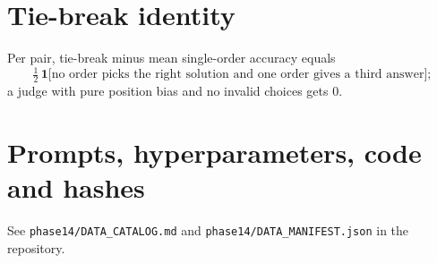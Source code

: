 \documentclass[11pt]{article}
\begin{document}
\section{Tie-break identity}\label{app:identity}Per pair, tie-break minus mean
single-order accuracy equals
\[\tfrac12\,\mathbf{1}\bigl[\text{no order picks the right solution and one order gives a third answer}\bigr];\]
a judge with pure position bias and no invalid choices gets 0.
\section{Prompts, hyperparameters, code and hashes}See \nolinkurl{phase14/DATA_CATALOG.md} and \nolinkurl{phase14/DATA_MANIFEST.json} in the repository.
\end{document}
